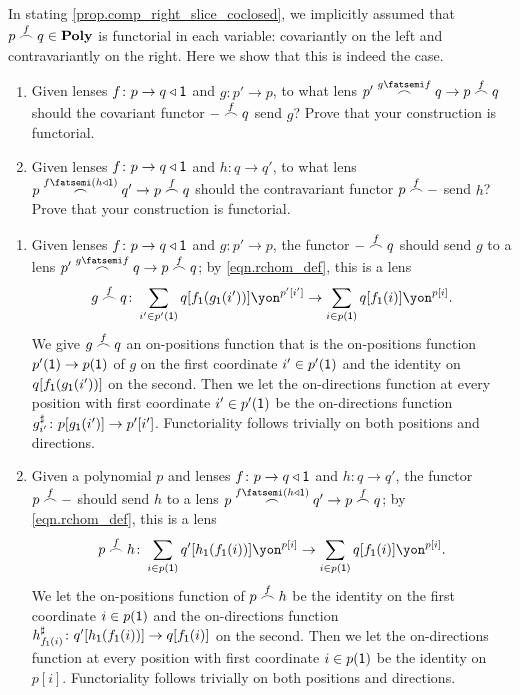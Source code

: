 \documentclass[Book-Poly]{subfiles}
\begin{document}
\begin{exercise} \label{exc.rchom_func}
In stating \cref{prop.comp_right_slice_coclosed}, we implicitly assumed that $p\overset{f}{\frown}q\in\mathbf{Poly}$ is functorial in each variable: covariantly on the left and contravariantly on the right.
Here we show that this is indeed the case.
\begin{enumerate}
    \item Given lenses $f\colon p\to q\mathbin{\triangleleft}\textsf{1}$ and $g\colon p'\to p$, to what lens $p'\rchom{g\then f}q\to p\rchom{f}q$ should the covariant functor $-\overset{f}{\frown}q$ send $g$?
    Prove that your construction is functorial.
    
    \item Given lenses $f\colon p\to q\mathbin{\triangleleft}\textsf{1}$ and $h\colon q\to q'$, to what lens $p\rchom{f\then(h\tri\1)}q'\to p\rchom{f}q$ should the contravariant functor $p\overset{f}{\frown}-$ send $h$?
    Prove that your construction is functorial.
    \qedhere
\end{enumerate}
\begin{solution}
\begin{enumerate}
    \item Given lenses $f\colon p\to q\mathbin{\triangleleft}\textsf{1}$ and $g\colon p'\to p$, the functor $-\overset{f}{\frown}q$ should send $g$ to a lens $p'\rchom{g\then f}q\to p\rchom{f}q$; by \eqref{eqn.rchom_def}, this is a lens
    \[
        g\rchom{f}q\colon\sum_{i'\in p'(\1)}q[f_\1(g_\1(i'))]\yon^{p'[i']}\to\sum_{i\in p(\1)}q[f_\1(i)]\yon^{p[i]}.
    \]
    We give $g\overset{f}{\frown}q$ an on-positions function that is the on-positions function $p'(\textsf{1})\to p(\textsf{1})$ of $g$ on the first coordinate $i'\in p'(\textsf{1})$ and the identity on $q[f_{\textsf{1}}(g_{\textsf{1}}(i'))]$ on the second.
    Then we let the on-directions function at every position with first coordinate $i'\in p'(\textsf{1})$ be the on-directions function $g^\sharp_{i'}\colon p[g_{\textsf{1}}(i')]\to p'[i']$.
    Functoriality follows trivially on both positions and directions.

    \item Given a polynomial $p$ and lenses $f\colon p\to q\mathbin{\triangleleft}\textsf{1}$ and $h\colon q\to q'$, the functor $p\overset{f}{\frown}-$ should send $h$ to a lens $p\rchom{f\then(h\tri\1)}q'\to p\rchom{f}q$; by \eqref{eqn.rchom_def}, this is a lens
    \[
        p\rchom{f}h\colon\sum_{i\in p(\1)}q'[h_\1(f_\1(i))]\yon^{p[i]}\to\sum_{i\in p(\1)}q[f_\1(i)]\yon^{p[i]}.
    \]
    We let the on-positions function of $p\overset{f}{\frown}h$ be the identity on the first coordinate $i\in p(\textsf{1})$ and the on-directions function $h^\sharp_{f_{\textsf{1}}(i)}\colon q'[h_{\textsf{1}}(f_{\textsf{1}}(i))]\to q[f_{\textsf{1}}(i)]$ on the second.
    Then we let the on-directions function at every position with first coordinate $i\in p(\textsf{1})$ be the identity on $p[i]$.
    Functoriality follows trivially on both positions and directions.
\end{enumerate}
\end{solution}
\end{exercise}
\end{document}
